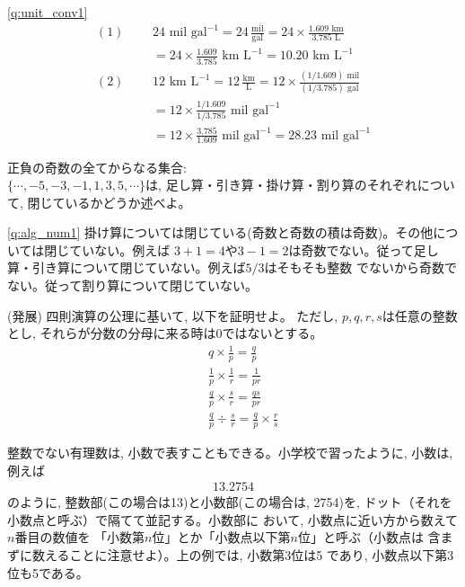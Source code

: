 \ref{q:unit_conv1}　
\begin{eqnarray*}
(1)\,\,\,\,&&24\text{ mil gal}^{-1}=24\,\frac{\text{mil}}{\text{gal}}=24\times\frac{1.609\text{~km}}{3.785\text{~L}}\\
&&=24\times\frac{1.609}{3.785}\text{~km~L}^{-1}=10.20\text{~km~L}^{-1}\\
(2)\,\,\,\,&&12 \text{~km~L}^{-1}=12\,\frac{\text{km}}{\text{L}}=12\times\frac{(1/1.609)\text{ mil}}{(1/3.785)\text{ gal}}\\
&&=12\times\frac{1/1.609}{1/3.785}\text{ mil gal}^{-1}\\
&&=12\times\frac{3.785}{1.609}\text{ mil gal}^{-1}=28.23\text{ mil gal}^{-1}
\end{eqnarray*}
\vspace{0.5cm}







\begin{q}\label{q:alg_num1}
正負の奇数の全てからなる集合:\\
$\{\cdots, -5, -3, -1, 1, 3, 5, \cdots\}$は, 
足し算・引き算・掛け算・割り算のそれぞれについて, 閉じているかどうか述べよ。
\end{q}

\ref{q:alg_num1} 
掛け算については閉じている(奇数と奇数の積は奇数)。その他については閉じていない。例えば
$3+1=4$や$3-1=2$は奇数でない。従って足し算・引き算について閉じていない。例えば$5/3$はそもそも整数
でないから奇数でない。従って割り算について閉じていない。\\



\begin{q}\label{q:unit_missing} (発展) 四則演算の公理に基いて, 以下を証明せよ。
ただし, $p, q, r, s$は任意の整数とし, それらが分数の分母に来る時は0ではないとする。
\begin{eqnarray}
&&q\times\frac{1}{p}=\frac{q}{p}\\
&&\frac{1}{p}\times\frac{1}{r}=\frac{1}{pr}\\
&&\frac{q}{p}\times\frac{s}{r}=\frac{qs}{pr}\\
&&\frac{q}{p}\div\frac{s}{r}=\frac{q}{p}\times\frac{r}{s}
\end{eqnarray}
\end{q}




整数でない有理数は, 小数で表すこともできる。小学校で習ったように, 小数は, 例えば
\begin{eqnarray}
13.2754
\end{eqnarray}
のように, 整数部(この場合は13)と小数部(この場合は, 2754)を, 
ドット（それを小数点と呼ぶ）で隔てて並記する。小数部に
おいて, 小数点に近い方から数えて$n$番目の数値を
「小数第$n$位」とか「小数点以下第$n$位」と呼ぶ（小数点は
含まずに数えることに注意せよ）。上の例では, 小数第3位は5
であり, 小数点以下第3位も5である。\\

